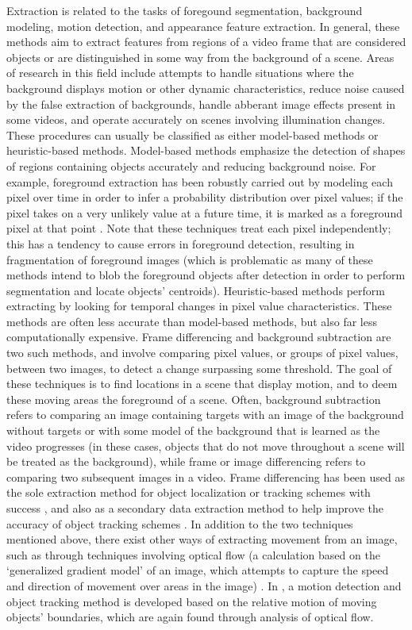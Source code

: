 \documentclass[smallcondensed, final]{svjour3}
\begin{document}
Extraction is related to the tasks of foregound segmentation, background modeling, motion detection, and appearance feature extraction. In general, these methods aim to extract features from regions of a video frame that are considered objects or are distinguished in some way from the background of a scene. Areas of research in this field include attempts to handle situations where the background displays motion or other dynamic characteristics, reduce noise caused by the false extraction of backgrounds, handle abberant image effects present in some videos, and operate accurately on scenes involving illumination changes. These procedures can usually be classified as either model-based methods or heuristic-based methods. Model-based methods emphasize the detection of shapes of regions containing objects accurately and reducing background noise. For example, foreground extraction has been robustly carried out by modeling each pixel over time in order to infer a probability distribution over pixel values; if the pixel takes on a very unlikely value at a future time, it is marked as a foreground pixel at that point \citep{stauffer_1999, elgammal_2000, elgammal_2002}. Note that these techniques treat each pixel independently; this has a tendency to cause errors in foreground detection, resulting in fragmentation of foreground images (which is problematic as many of these methods intend to blob the foreground objects after detection in order to perform segmentation and locate objects' centroids). Heuristic-based methods perform extracting by looking for temporal changes in pixel value characteristics. These methods are often less accurate than model-based methods, but also far less computationally expensive. Frame differencing and background subtraction are two such methods, and involve comparing pixel values, or groups of pixel values, between two images, to detect a change surpassing some threshold. The goal of these techniques is to find locations in a scene that display motion, and to deem these moving areas the foreground of a scene.  Often, background subtraction refers to comparing an image containing targets with an image of the background without targets or with some model of the background that is learned as the video progresses (in these cases, objects that do not move throughout a scene will be treated as the background), while frame or image differencing refers to comparing two subsequent images in a video. Frame differencing has been used as the sole extraction method for object localization or tracking schemes with success \citep{pece_2002, beleznai_2006, chu_2007}, and also as a secondary data extraction method to help improve the accuracy of object tracking schemes \citep{perez_2002}. In addition to the two techniques mentioned above, there exist other ways of extracting movement from an image, such as through techniques involving optical flow (a calculation based on the `generalized gradient model' of an image, which attempts to capture the speed and direction of movement over areas in the image) \citep{horn_1981, bobick_2001}. In \citep{black_2000}, a motion detection and object tracking method is developed based on the relative motion of moving objects' boundaries, which are again found through analysis of optical flow.
\end{document}
